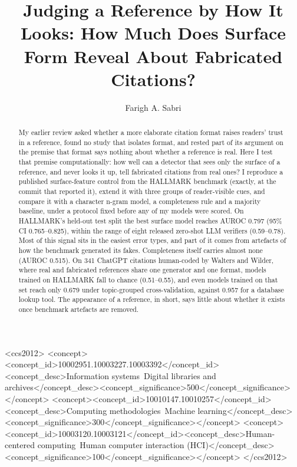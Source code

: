 \documentclass[acmsmall,nonacm]{acmart}
\begin{document}
\title{Judging a Reference by How It Looks: How Much Does Surface Form Reveal About Fabricated Citations?}

\author{Farigh A. Sabri}

\begin{abstract}
My earlier review asked whether a more elaborate citation format raises readers' trust in a reference, found no study that isolates format, and rested part of its argument on the premise that format says nothing about whether a reference is real. Here I test that premise computationally: how well can a detector that sees only the surface of a reference, and never looks it up, tell fabricated citations from real ones? I reproduce a published surface-feature control from the HALLMARK benchmark (exactly, at the commit that reported it), extend it with three groups of reader-visible cues, and compare it with a character n-gram model, a completeness rule and a majority baseline, under a protocol fixed before any of my models were scored. On HALLMARK's held-out test split the best surface model reaches AUROC 0.797 (95\% CI 0.765--0.825), within the range of eight released zero-shot LLM verifiers (0.59--0.78). Most of this signal sits in the easiest error types, and part of it comes from artefacts of how the benchmark generated its fakes. Completeness itself carries almost none (AUROC 0.515). On 341 ChatGPT citations human-coded by Walters and Wilder, where real and fabricated references share one generator and one format, models trained on HALLMARK fall to chance (0.51--0.55), and even models trained on that set reach only 0.679 under topic-grouped cross-validation, against 0.957 for a database lookup tool. The appearance of a reference, in short, says little about whether it exists once benchmark artefacts are removed.
\end{abstract}

\begin{CCSXML}
<ccs2012>
<concept><concept_id>10002951.10003227.10003392</concept_id><concept_desc>Information systems~Digital libraries and archives</concept_desc><concept_significance>500</concept_significance></concept>
<concept><concept_id>10010147.10010257</concept_id><concept_desc>Computing methodologies~Machine learning</concept_desc><concept_significance>300</concept_significance></concept>
<concept><concept_id>10003120.10003121</concept_id><concept_desc>Human-centered computing~Human computer interaction (HCI)</concept_desc><concept_significance>100</concept_significance></concept>
</ccs2012>
\end{CCSXML}
\end{document}
